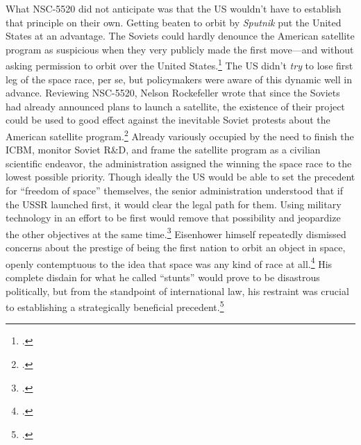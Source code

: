 \documentclass{report}
\begin{document}
What NSC-5520 did not anticipate was that the US wouldn't have to establish that principle on their own. Getting beaten to orbit by \emph{Sputnik} put the United States at an advantage. The Soviets could hardly denounce the American satellite program as suspicious when they very publicly made the first move---and without asking permission to orbit over the United States.\footcite[p.~40]{peebles_corona_1997} The US didn't \emph{try} to lose first leg of the space race, per se, but policymakers were aware of this dynamic well in advance. Reviewing NSC-5520, Nelson Rockefeller wrote that since the Soviets had already announced plans to launch a satellite, the existence of their project could be used to good effect against the inevitable Soviet protests about the American satellite program.\footcite[p.~120]{mcdougall_heavens_1985} Already variously occupied by the need to finish the ICBM, monitor Soviet R\&D, and frame the satellite program as a civilian scientific endeavor, the administration assigned the winning the space race to the lowest possible priority. Though ideally the US would be able to set the precedent for ``freedom of space'' themselves, the senior administration understood that if the USSR launched first, it would clear the legal path for them. Using military technology in an effort to be first would remove that possibility and jeopardize the other objectives at the same time.\footcite[p.~123-124]{mcdougall_heavens_1985} Eisenhower himself repeatedly dismissed concerns about the prestige of being the first nation to orbit an object in space, openly contemptuous to the idea that space was any kind of race at all.\footcite[p.~100]{lindgren_trust_2000} His complete disdain for what he called ``stunts'' would prove to be disastrous politically, but from the standpoint of international law, his restraint was crucial to establishing a strategically beneficial precedent.\footcite[p.~134]{day_eye_2015}
\end{document}
